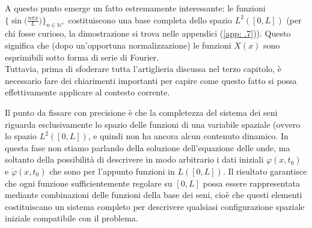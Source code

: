 \documentclass[a4paper,12pt]{report}
\begin{document}
A questo punto emerge un fatto estremamente interessante: le funzioni $\bigg\{\sin\bigg(\frac{n\pi x}{L}\bigg)\bigg\}_{n\in\mathbb{N}^+}$ costituiscono una base completa dello spazio $L^2([0,L])$ (per chi fosse curioso, la dimostrazione si trova nelle appendici (\ref{app: .7})). Questo significa che (dopo un'opportuna normalizzazione) le funzioni $X(x)$ sono esprimibili sotto forma di serie di Fourier. 
\\Tuttavia, prima di sfoderare tutta l'artiglieria discussa nel terzo capitolo, è necessario fare dei chiarimenti importanti per capire come questo fatto si possa effettivamente applicare al contesto corrente.

Il punto da fissare con precisione è che la completezza del sistema dei seni riguarda esclusivamente lo spazio delle funzioni di una variabile spaziale (ovvero lo spazio $L^2([0,L])$, e quindi non ha ancora alcun contenuto dinamico. In questa fase non stiamo parlando della soluzione dell’equazione delle onde, ma soltanto della possibilità di descrivere in modo arbitrario i dati iniziali $\varphi(x,t_0)$ e $\dot{\varphi}(x,t_0)$ che sono per l'appunto funzioni in $L([0,L])$. Il risultato garantisce che ogni funzione sufficientemente regolare su $[0,L]$ possa essere rappresentata mediante combinazioni delle funzioni della base dei seni, cioè che questi elementi costituiscano un sistema completo per descrivere qualsiasi configurazione spaziale iniziale compatibile con il problema.

\newpage
\end{document}
